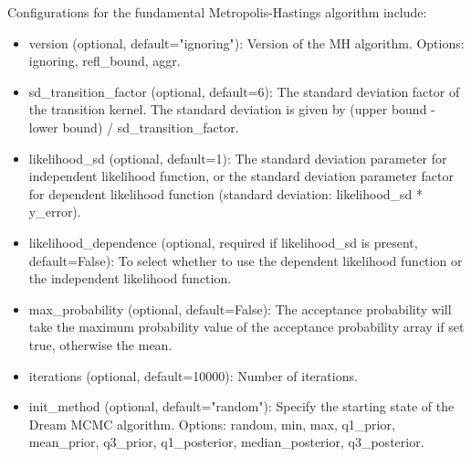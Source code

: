 Configurations for the fundamental Metropolis-Hastings algorithm include:
\begin{itemize}
    \item version (optional, default="ignoring"): Version of the MH algorithm. Options: ignoring, refl\_bound, aggr.
    \item sd\_transition\_factor (optional, default=6): The standard deviation factor of the transition kernel. The standard deviation is given by (upper bound - lower bound) / sd\_transition\_factor.
    \item likelihood\_sd (optional, default=1): The standard deviation parameter for independent likelihood function, or the standard deviation parameter factor for dependent likelihood function (standard deviation: likelihood\_sd * y\_error).
    \item likelihood\_dependence (optional, required if likelihood\_sd is present, default=False): To select whether to use the dependent likelihood function or the independent likelihood function.
    \item max\_probability (optional, default=False): The acceptance probability will take the maximum probability value of the acceptance probability array if set true, otherwise the mean.
    \item iterations (optional, default=10000): Number of iterations.
    \item init\_method (optional, default="random"): Specify the starting state of the Dream MCMC algorithm. Options: random, min, max, q1\_prior, mean\_prior, q3\_prior, q1\_posterior, median\_posterior, q3\_posterior.
\end{itemize}

